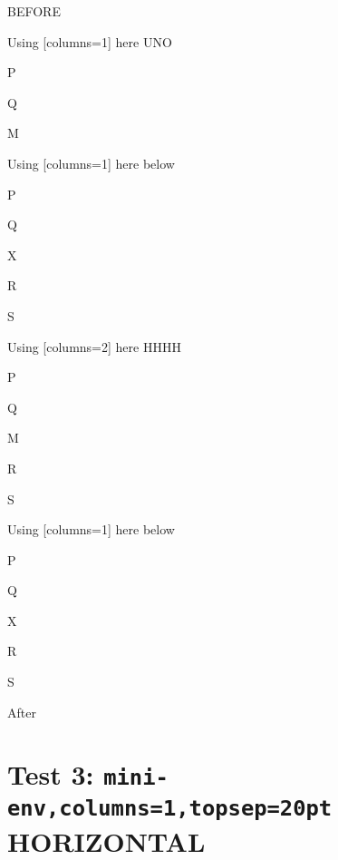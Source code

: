 \documentclass[12pt]{article}
\begin{document}
BEFORE
\begin{enumext}[columns=2]
\item Using [columns=1] here UNO
  \begin{enumext}[columns=1,topsep=0pt]%
     \item  P \item Q \item M %
  \end{enumext}

\item Using [columns=1] here below
\begin{enumext}[columns=1]%
     \item  P \item Q \item X  \item R \item S
  \end{enumext}

\columnbreak

\item Using [columns=2] here HHHH
  \begin{enumext}[columns=2,topsep=0pt]%
    \item  P \item Q \item M \item R \item S
  \end{enumext}

\item Using [columns=1] here below
\begin{enumext}[columns=1]%
     \item  P \item Q \item X  \item R \item S
  \end{enumext}

\end{enumext}
After

\section{Test 3: \texttt{mini-env,columns=1,topsep=20pt} HORIZONTAL}
\end{document}

